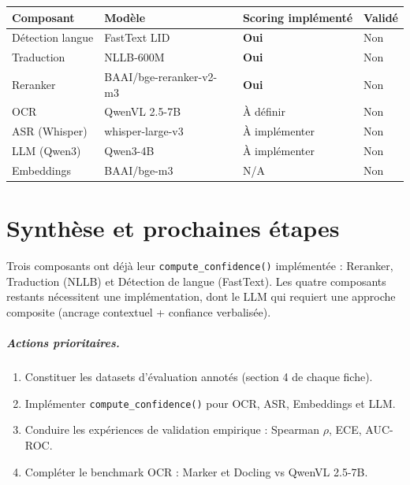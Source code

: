 \documentclass[11pt,a4paper]{report}
\begin{document}
\begin{center}
\begin{tabular}{llll}
\toprule
\textbf{Composant} & \textbf{Modèle} & \textbf{Scoring implémenté} & \textbf{Validé} \\
\midrule
Détection langue & FastText LID            & \textbf{Oui}  & Non \\
Traduction       & NLLB-600M               & \textbf{Oui}  & Non \\
Reranker         & BAAI/bge-reranker-v2-m3 & \textbf{Oui}  & Non \\
OCR              & QwenVL 2.5-7B           & À définir     & Non \\
ASR (Whisper)    & whisper-large-v3        & À implémenter & Non \\
LLM (Qwen3)      & Qwen3-4B                & À implémenter & Non \\
Embeddings       & BAAI/bge-m3             & N/A           & Non \\
\bottomrule
\end{tabular}
\end{center}

\clearpage









\chapter*{Synthèse et prochaines étapes}

Trois composants ont déjà leur \texttt{compute\_confidence()} implémentée :
Reranker, Traduction (NLLB) et Détection de langue (FastText). Les quatre
composants restants nécessitent une implémentation, dont le LLM qui requiert
une approche composite (ancrage contextuel + confiance verbalisée).

\paragraph{Actions prioritaires.}
\begin{enumerate}
  \item Constituer les datasets d'évaluation annotés (section 4 de chaque fiche).
  \item Implémenter \texttt{compute\_confidence()} pour OCR, ASR, Embeddings et LLM.
  \item Conduire les expériences de validation empirique : Spearman $\rho$, ECE, AUC-ROC.
  \item Compléter le benchmark OCR : Marker et Docling vs QwenVL 2.5-7B.
\end{enumerate}
\end{document}
